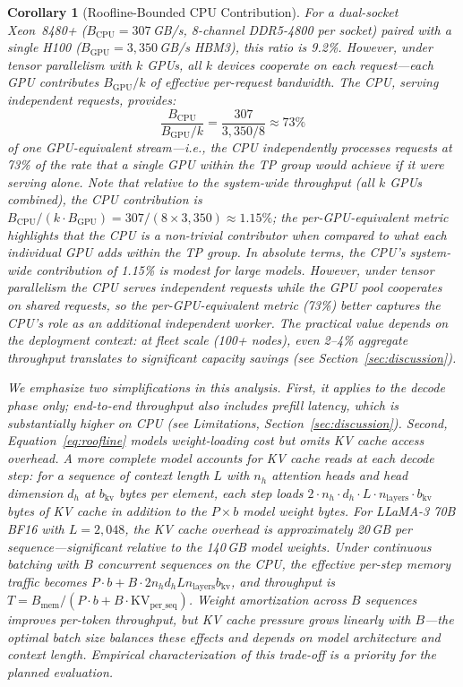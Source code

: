 \documentclass[10pt,conference]{IEEEtran}
\newtheorem{corollary}[theorem]{Corollary}
\begin{document}
\begin{corollary}[Roofline-Bounded CPU Contribution]
For a dual-socket Xeon~8480+ ($B_\text{CPU} = 307$\,GB/s, 8-channel DDR5-4800 per socket) paired with a single H100 ($B_\text{GPU} = 3{,}350$\,GB/s HBM3), this ratio is 9.2\%.
However, under tensor parallelism with $k$ GPUs, all $k$ devices cooperate on each request---each GPU contributes $B_\text{GPU}/k$ of effective per-request bandwidth.
The CPU, serving independent requests, provides:
\begin{equation}
\label{eq:tp-ratio}
\frac{B_\text{CPU}}{B_\text{GPU} / k} = \frac{307}{3{,}350 / 8} \approx 73\%
\end{equation}
of one GPU-equivalent stream---i.e., the CPU independently processes requests at 73\% of the rate that a \emph{single} GPU within the TP group would achieve if it were serving alone.
Note that relative to the \emph{system-wide} throughput (all $k$ GPUs combined), the CPU contribution is $B_\text{CPU}/(k \cdot B_\text{GPU}) = 307/(8 \times 3{,}350) \approx 1.15\%$; the per-GPU-equivalent metric highlights that the CPU is a non-trivial contributor when compared to what each individual GPU adds within the TP group.
In absolute terms, the CPU's system-wide contribution of 1.15\% is modest for large models.
However, under tensor parallelism the CPU serves \emph{independent} requests while the GPU pool cooperates on shared requests, so the per-GPU-equivalent metric (73\%) better captures the CPU's role as an additional independent worker.
The practical value depends on the deployment context: at fleet scale (100+ nodes), even 2--4\% aggregate throughput translates to significant capacity savings (see Section~\ref{sec:discussion}).

We emphasize two simplifications in this analysis.
First, it applies to the \emph{decode} phase only; end-to-end throughput also includes prefill latency, which is substantially higher on CPU (see Limitations, Section~\ref{sec:discussion}).
Second, Equation~\ref{eq:roofline} models weight-loading cost but omits KV cache access overhead.
A more complete model accounts for KV cache reads at each decode step: for a sequence of context length $L$ with $n_h$ attention heads and head dimension $d_h$ at $b_\text{kv}$ bytes per element, each step loads $2 \cdot n_h \cdot d_h \cdot L \cdot n_\text{layers} \cdot b_\text{kv}$ bytes of KV cache in addition to the $P \times b$ model weight bytes.
For LLaMA-3 70B BF16 with $L = 2{,}048$, the KV cache overhead is approximately 20\,GB per sequence---significant relative to the 140\,GB model weights.
Under continuous batching with $B$ concurrent sequences on the CPU, the effective per-step memory traffic becomes $P \cdot b + B \cdot 2 n_h d_h L n_\text{layers} b_\text{kv}$, and throughput is $T = B_\text{mem} / (P \cdot b + B \cdot \text{KV}_\text{per\_seq})$.
Weight amortization across $B$ sequences improves per-token throughput, but KV cache pressure grows linearly with $B$---the optimal batch size balances these effects and depends on model architecture and context length.
Empirical characterization of this trade-off is a priority for the planned evaluation.
\end{corollary}
\end{document}
